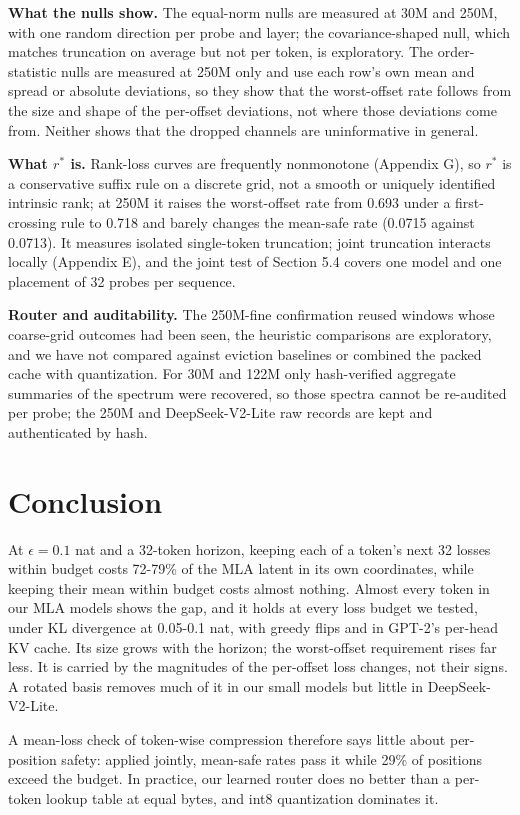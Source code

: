 \documentclass[10pt]{article}
\begin{document}
\textbf{What the nulls show.} The equal-norm nulls are measured at 30M and 250M, with one random direction per probe and layer; the covariance-shaped null, which matches truncation on average but not per token, is exploratory. The order-statistic nulls are measured at 250M only and use each row's own mean and spread or absolute deviations, so they show that the worst-offset rate follows from the size and shape of the per-offset deviations, not where those deviations come from. Neither shows that the dropped channels are uninformative in general.

\textbf{What $r^*$ is.} Rank-loss curves are frequently nonmonotone (Appendix G), so $r^*$ is a conservative suffix rule on a discrete grid, not a smooth or uniquely identified intrinsic rank; at 250M it raises the worst-offset rate from 0.693 under a first-crossing rule to 0.718 and barely changes the mean-safe rate (0.0715 against 0.0713). It measures isolated single-token truncation; joint truncation interacts locally (Appendix E), and the joint test of Section 5.4 covers one model and one placement of 32 probes per sequence.

\textbf{Router and auditability.} The 250M-fine confirmation reused windows whose coarse-grid outcomes had been seen, the heuristic comparisons are exploratory, and we have not compared against eviction baselines or combined the packed cache with quantization. For 30M and 122M only hash-verified aggregate summaries of the spectrum were recovered, so those spectra cannot be re-audited per probe; the 250M and DeepSeek-V2-Lite raw records are kept and authenticated by hash.

\section{Conclusion}

At $\epsilon=0.1$ nat and a 32-token horizon, keeping each of a token's next 32 losses within budget costs 72-79\% of the MLA latent in its own coordinates, while keeping their mean within budget costs almost nothing. Almost every token in our MLA models shows the gap, and it holds at every loss budget we tested, under KL divergence at 0.05-0.1 nat, with greedy flips and in GPT-2's per-head KV cache. Its size grows with the horizon; the worst-offset requirement rises far less. It is carried by the magnitudes of the per-offset loss changes, not their signs. A rotated basis removes much of it in our small models but little in DeepSeek-V2-Lite.

A mean-loss check of token-wise compression therefore says little about per-position safety: applied jointly, mean-safe rates pass it while 29\% of positions exceed the budget. In practice, our learned router does no better than a per-token lookup table at equal bytes, and int8 quantization dominates it.
\end{document}
